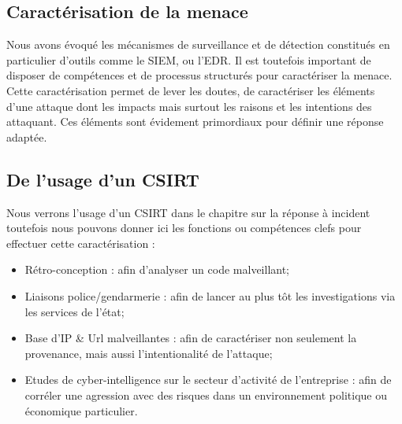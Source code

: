 
\subsection{Caractérisation de la menace}

Nous avons évoqué les mécanismes de surveillance et de détection constitués en particulier d'outils comme le SIEM, ou l'EDR.
Il est toutefois important de disposer de compétences et de processus structurés pour caractériser la menace.
Cette caractérisation permet de lever les doutes, de caractériser les éléments d'une attaque dont les impacts mais surtout les raisons et les intentions des attaquant. Ces éléments sont évidement primordiaux pour définir une réponse adaptée.

\subsection{De l'usage d'un CSIRT}

Nous verrons l'usage d'un CSIRT dans le chapitre sur la réponse à incident toutefois nous pouvons donner ici les fonctions ou compétences clefs pour effectuer cette caractérisation :

\begin{itemize}
  \item Rétro-conception : afin d'analyser un code malveillant;
  \item Liaisons police/gendarmerie : afin de lancer au plus tôt les investigations via les services de l'état;
  \item Base  d'IP \& Url malveillantes : afin de caractériser non seulement la provenance, mais aussi l'intentionalité de l'attaque;
  \item Etudes de cyber-intelligence sur le secteur d'activité de l'entreprise : afin de corréler une agression avec des risques dans un environnement politique ou économique particulier.
\end{itemize}
